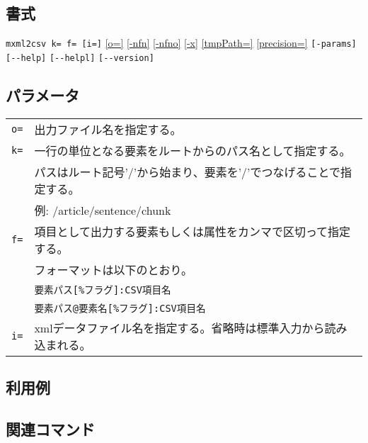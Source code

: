 \subsection*{書式}
\verb|mxml2csv k= f= [i=]|
\hyperref[sect:option_o]{[o=]}
\hyperref[sect:option_nfn]{[-nfn]} 
\hyperref[sect:option_nfno]{[-nfno]}  
\hyperref[sect:option_x]{[-x]}
\hyperref[sect:option_option_tmppath]{[tmpPath=]}
\hyperref[sect:option_precision]{[precision=]}
\verb|[-params]|
\verb|[--help]|
\verb|[--helpl]|
\verb|[--version]|\\

\subsection*{パラメータ}
\begin{table}[htbp]
{\small
\begin{tabular}{ll}
\verb|o=|    & 出力ファイル名を指定する。\\
\verb|k=|    & 一行の単位となる要素をルートからのパス名として指定する。\\
             & パスはルート記号'/'から始まり、要素を'/'でつなげることで指定する。\\
             & 例: /article/sentence/chunk \\
\verb|f=|    & 項目として出力する要素もしくは属性をカンマで区切って指定する。\\
             & フォーマットは以下のとおり。 \\
             & \verb|要素パス[%フラグ]:CSV項目名| \\
             & \verb|要素パス@要素名[%フラグ]:CSV項目名| \\
\verb|i=|    & xmlデータファイル名を指定する。省略時は標準入力から読み込まれる。\\
\end{tabular} 
}
\end{table} 

\subsection*{利用例}

\subsection*{関連コマンド}

%
